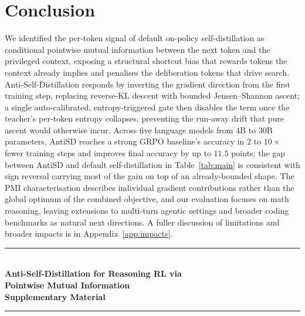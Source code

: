 \documentclass{article}
\begin{document}
\vspace{-0.5em}

\section{Conclusion}
\label{sec:conclusion}
\vspace{-0.5em}

We identified the per-token signal of default on-policy self-distillation as conditional pointwise mutual information between the next token and the privileged context, exposing a structural shortcut bias that rewards tokens the context already implies and penalises the deliberation tokens that drive search. Anti-Self-Distillation responds by inverting the gradient direction from the first training step, replacing reverse-KL descent with bounded Jensen--Shannon ascent; a single auto-calibrated, entropy-triggered gate then disables the term once the teacher's per-token entropy collapses, preventing the run-away drift that pure ascent would otherwise incur. Across five language models from $4$B to $30$B parameters, AntiSD reaches a strong GRPO baseline's accuracy in $2$ to $10\times$ fewer training steps and improves final accuracy by up to $11.5$ points; the gap between AntiSD and default self-distillation in Table~\ref{tab:main} is consistent with sign reversal carrying most of the gain on top of an already-bounded shape. The PMI characterisation describes individual gradient contributions rather than the global optimum of the combined objective, and our evaluation focuses on math reasoning, leaving extensions to multi-turn agentic settings and broader coding benchmarks as natural next directions. A fuller discussion of limitations and broader impacts is in Appendix~\ref{app:impacts}.




\newpage
\appendix

\begin{center}
  \noindent\rule{\linewidth}{3pt}\\[6pt]
  {\Large\bfseries Anti-Self-Distillation for Reasoning RL via\\[0.25em] Pointwise Mutual Information\\[0.4em] Supplementary Material}\\[6pt]
  \noindent\rule{\linewidth}{1pt}
\end{center}
\vspace{1em}
\end{document}
